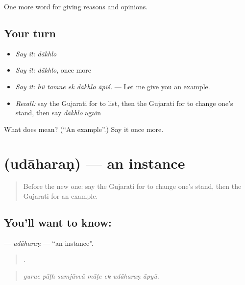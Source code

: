 \begin{grammarlens}[title={What you've built}]
One more word for giving reasons and opinions.
\end{grammarlens}

\subsection*{Your turn}
\begin{itemize}
\raggedright
  \item \emph{Say it:} \emph{dākhlo}
  \item \emph{Say it:} \emph{dākhlo}, once more
  \item \emph{Say it:} \emph{hũ tamne ek dākhlo āpīś.} — Let me give you an example.
  \item \emph{Recall:} say the Gujarati for to list, then the Gujarati for to change one's stand, then say \emph{dākhlo} again
\end{itemize}

\begin{tcolorbox}[breakable,colback=teal!4,colframe=teal!35!black,title={Before you move on}]
What does  mean? (\textquotedblleft{}An example\textquotedblright{}.) Say it once more.
\end{tcolorbox}
\section[\texorpdfstring{\gu{ઉદાહરણ} (udāharaṇ)}{ઉદાહરણ (udāharaṇ)}]{ (udāharaṇ) — an instance}

\label{lesson:GU-C346-udaharan}



\begin{quote}
Before the new one: say the Gujarati for to change one's stand, then the Gujarati for an example.
\end{quote}

\subsection*{You'll want to know: }
\textbf{} — \emph{udāharaṇ} — \textquotedblleft{}an instance\textquotedblright{}.

\begin{quote}
      .
\end{quote}

\begin{quote}
\emph{gurue pāṭh samjāvvā māṭe ek udāharaṇ āpyũ.}
\end{quote}

